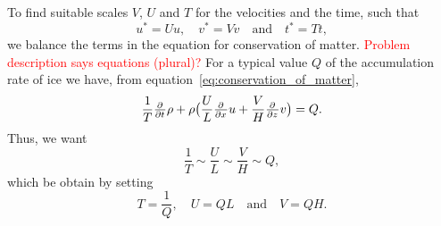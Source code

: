 To find suitable scales $V$, $U$ and $T$ for the velocities and the time, such that
%
\begin{equation*}
    u^* = Uu, \quad v^* = Vv \quad \text{and} \quad t^* = Tt,
\end{equation*}
%
we balance the terms in the equation for conservation of matter. \textcolor{red}{Problem description says equations (plural)?} For a typical value $Q$ of the accumulation rate of ice we have, from equation~\eqref{eq:conservation_of_matter},
%
\begin{equation*}
  \frac{1}{T} \pd{}{t} \rho + \rho \big( \frac{U}{L} \pd{}{x} u + \frac{V}{H} \pd{}{z} v \big) = Q.
\end{equation*}
%
Thus, we want
%
\begin{equation*}
    \frac{1}{T} \sim \frac{U}{L} \sim \frac{V}{H} \sim Q,
\end{equation*}
%
which be obtain by setting
%
\begin{equation*}
    T = \frac{1}{Q}, \quad U = QL \quad \text{and} \quad V = QH.
\end{equation*}
